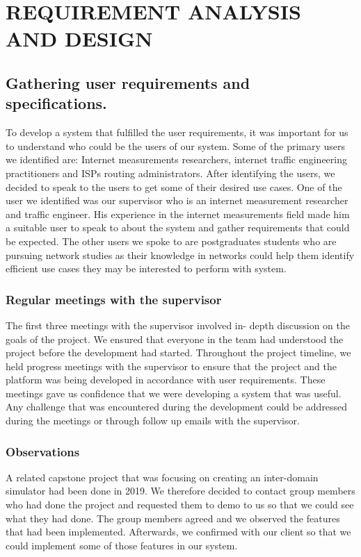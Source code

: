 \section{REQUIREMENT ANALYSIS AND DESIGN}\label{sec:design-decision}

\subsection{Gathering user requirements and specifications.}\label{subsec:Gathering user requirements and specifications.}
To develop a system that fulfilled the user requirements, it was important for us to understand who could be the users of our system. Some of the primary users we identified are: Internet measurements researchers, internet traffic engineering practitioners and ISPs routing administrators. After identifying the users, we decided to speak to the users to get some of their desired use cases. One of the user we identified was our supervisor who is an internet measurement researcher and traffic engineer. His experience in the internet measurements field made him a suitable user to speak to about the system and gather requirements that could be expected. The other users we spoke to are postgraduates students who are pursuing network studies as their knowledge in networks could help them identify efficient use cases they may be interested to perform with system.

\subsubsection{Regular meetings with the supervisor}
 The first three meetings with the supervisor involved in- depth discussion on the goals of the project. We ensured that everyone in the team had understood the project before the development had started. Throughout the project timeline, we held progress meetings with the supervisor to ensure that the project and the platform was being developed in accordance with user requirements.  These meetings gave us confidence that we were developing a system that was useful. Any challenge that was encountered during the development could be addressed during the meetings or through follow up emails with the supervisor.  
\subsubsection{Observations}
A related capstone project that was focusing on creating an inter-domain simulator had been done in 2019. We therefore decided to contact group members who had done the project and requested them to demo to us so that we could see what they had done. The group members agreed and we observed the features that had been implemented. Afterwards, we confirmed with our client so that we could implement some of those features in our system.
